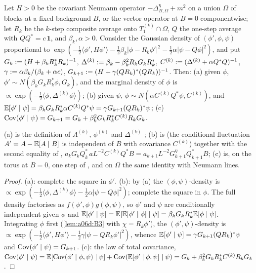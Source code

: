 \begin{lemma}\label{lem:a06d:B6}
Let $H>0$ be the covariant Neumann operator $-\Delta^\eta_{B,\Omega}+m^2$ on a union $\Omega$ of blocks at a fixed background $B$, or the vector operator at $B=0$ componentwise; let $R_k$ be the $k$-step composite average onto $T^{(k)}_1\cap\Omega$, $Q$ the one-step average with $QQ^*=c\,\mathbf 1$, and $\beta_k,\alpha>0$. Consider the Gaussian density of $(\phi',\phi,\psi)$ proportional to $\exp(-\frac12\langle\phi',H\phi'\rangle-\frac12\beta_k|\phi-R_k\phi'|^2-\frac12\alpha|\psi-Q\phi|^2)$, and put $G_k:=(H+\beta_kR_k^*R_k)^{-1}$, $\Delta^{(k)}:=\beta_k-\beta_k^2R_kG_kR_k^*$, $C^{(k)}:=(\Delta^{(k)}+\alpha Q^*Q)^{-1}$, $\gamma:=\alpha\beta_k/(\beta_k+\alpha c)$, $G_{k+1}:=(H+\gamma(QR_k)^*(QR_k))^{-1}$. Then: \textup{(a)} given $\phi$, $\phi'\sim N(\beta_kG_kR_k^*\phi,G_k)$, and the marginal density of $\phi$ is $\propto\exp(-\frac12\langle\phi,\Delta^{(k)}\phi\rangle)$; \textup{(b)} given $\psi$, $\phi\sim N(\alpha C^{(k)}Q^*\psi,C^{(k)})$, and $\mathbb E[\phi'\mid\psi]=\beta_kG_kR_k^*\alpha C^{(k)}Q^*\psi=\gamma G_{k+1}(QR_k)^*\psi$; \textup{(c)} $\operatorname{Cov}(\phi'\mid\psi)=G_{k+1}=G_k+\beta_k^2G_kR_k^*C^{(k)}R_kG_k$.
\end{lemma}

(a) is the definition of $A^{(k)}$, $\phi^{(k)}$ and $\Delta^{(k)}$ \cite[(3.29), (2.21)]{Ba1}; (b) is \cite[(3.41)]{Ba1} (the conditional fluctuation $A'=A-\mathbb E[A\mid B]$ is independent of $B$ with covariance $C^{(k)}$) together with the second equality of \cite[(3.42)]{Ba1}, $a_kG_kQ_k^*\,aL^{-2}C^{(k)}Q^*B=a_{k+1}L^{-2}G^\eta_{k+1}Q^*_{k+1}B$; (c) is, on the torus at $B=0$, one step of \cite[(1.27)]{Ba3}, and on $\Omega$ the same identity with Neumann lines.

\begin{proof}
(a): complete the square in $\phi'$. (b): by (a) the $(\phi,\psi)$-density is $\propto\exp(-\frac12\langle\phi,\Delta^{(k)}\phi\rangle-\frac12\alpha|\psi-Q\phi|^2)$; complete the square in $\phi$. The full density factorises as $f(\phi',\phi)g(\phi,\psi)$, so $\phi'$ and $\psi$ are conditionally independent given $\phi$ and $\mathbb E[\phi'\mid\psi]=\mathbb E[\mathbb E[\phi'\mid\phi]\mid\psi]=\beta_kG_kR_k^*\mathbb E[\phi\mid\psi]$. Integrating $\phi$ first (\cref{lem:a06d:B3} with $\chi=R_k\phi'$), the $(\phi',\psi)$-density is $\propto\exp(-\frac12\langle\phi',H\phi'\rangle-\frac12\gamma|\psi-QR_k\phi'|^2)$, whence $\mathbb E[\phi'\mid\psi]=\gamma G_{k+1}(QR_k)^*\psi$ and $\operatorname{Cov}(\phi'\mid\psi)=G_{k+1}$. (c): the law of total covariance, $\operatorname{Cov}(\phi'\mid\psi)=\mathbb E[\operatorname{Cov}(\phi'\mid\phi,\psi)\mid\psi]+\operatorname{Cov}(\mathbb E[\phi'\mid\phi,\psi]\mid\psi)=G_k+\beta_k^2G_kR_k^*C^{(k)}R_kG_k$.
\end{proof}

